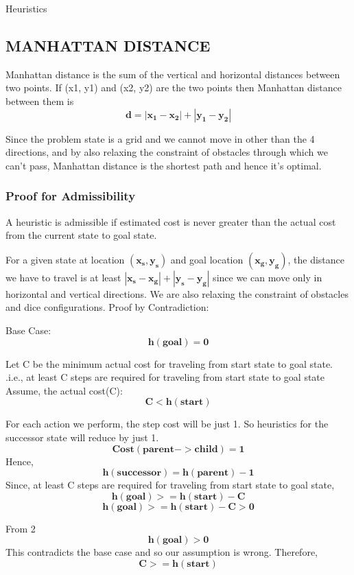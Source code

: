 \documentclass[12pt]{article}
\begin{document}
 \begin{section}{Heuristics}
 \label{heuristics}
 \subsection{MANHATTAN DISTANCE}
 Manhattan distance is the sum of the vertical and horizontal distances between two points. If (x1, y1) and (x2, y2) are the two points then Manhattan distance between them is 
\begin{equation}\mathbf{ d= |x_1-x_2|+|y_1-y_2|} \end{equation}  
\par Since the problem state is a grid and we cannot move in other than the 4 directions, and by also relaxing the constraint of obstacles through which we can’t pass, Manhattan distance is the shortest path and hence it’s optimal.

\subsubsection{Proof for Admissibility}
A heuristic is admissible if estimated cost is never greater than the actual cost from the current state to goal state\cite{Russell:2003:AIM:773294}.
\par
For a given state at location $\mathbf{(x_s, y_s)}$ and goal location $\mathbf{(x_g, y_g)}$, the distance we have to travel is at least $\mathbf{|x_s - x_g| + |y_s - y_g|}$ since we can move only in horizontal and vertical directions. We are also relaxing the constraint of obstacles and dice configurations.
Proof by Contradiction:
\par
Base Case:
\[
 {\mathbf{h(goal) = 0}} 
\]

Let C be the minimum actual cost for traveling from start state to goal state. .i.e., at least C steps are required for traveling from start state to goal state Assume, the actual cost(C):
\begin{equation}\mathbf{ \mathbf{C < h(start)}} \end{equation}  

For each action we perform, the step cost will be just 1. So heuristics for the successor state will reduce by just 1.
\[
 {\mathbf{Cost(parent -> child) = 1}} 
\]
Hence,
\[
 {\mathbf{h(successor) = h(parent) - 1}} 
\]
Since, at least C steps are required for traveling from start state to goal state,
\[
 {\mathbf{h(goal) >= h(start) - C}} 
\]
\[
 {\mathbf{h(goal) >= h(start) - C > 0}} 
\] 

From 2
\[
 {\mathbf{h(goal) > 0}} 
\] 
This contradicts the base case and so our assumption is wrong.
Therefore, 
\[
 {\mathbf{C >= h(start)}} 
\] 


\end{section}
\end{document}
